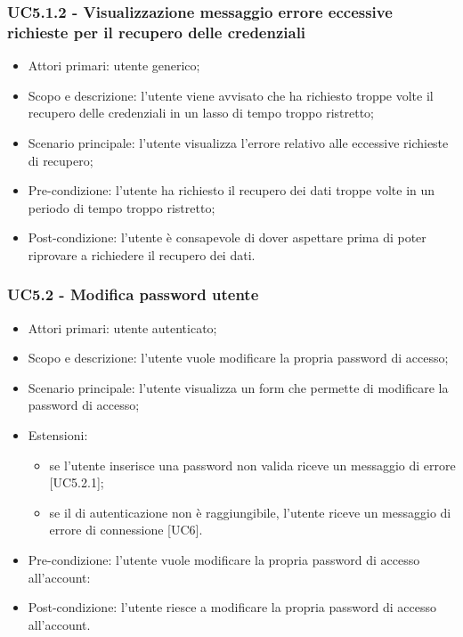 \subsubsection{UC5.1.2 - Visualizzazione messaggio errore eccessive richieste per il recupero delle credenziali}
\begin{itemize}
	\item  Attori primari: utente generico;
	\item  Scopo e descrizione: l'utente viene avvisato che ha richiesto troppe volte il recupero delle credenziali in un lasso di tempo troppo ristretto;
	\item  Scenario principale: l'utente visualizza l'errore relativo alle eccessive richieste di recupero;
	\item  Pre-condizione: l'utente ha richiesto il recupero dei dati troppe volte in un periodo di tempo troppo ristretto;
	\item  Post-condizione: l'utente è consapevole di dover aspettare prima di poter riprovare a richiedere il recupero dei dati.
\end{itemize}
\subsubsection{UC5.2 - Modifica password utente}
\begin{itemize}
	\item  Attori primari: utente autenticato;
	\item  Scopo e descrizione: l'utente vuole modificare la propria password di accesso;
	\item  Scenario principale: l'utente visualizza un form che permette di modificare la password di accesso;
	\item  Estensioni: 
		   \begin{itemize}
		   		\item se l'utente inserisce una password non valida riceve un messaggio di errore [UC5.2.1];
				\item se il  di autenticazione non è raggiungibile, l'utente riceve un messaggio di errore di connessione [UC6].
		   \end{itemize}
	\item  Pre-condizione: l'utente vuole modificare la propria password di accesso all'account:
	\item  Post-condizione: l'utente riesce a modificare la propria password di accesso all'account.
\end{itemize}
